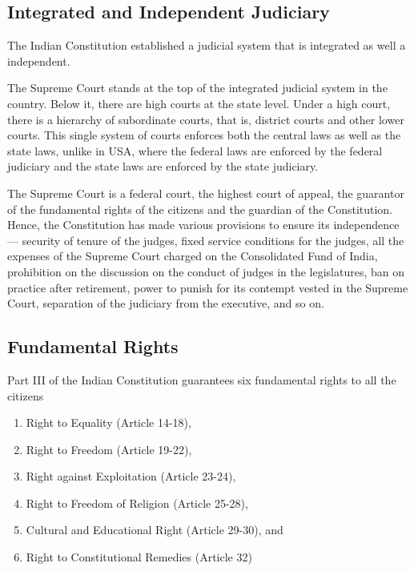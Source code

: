 \subsection{Integrated and Independent Judiciary}

The Indian Constitution established a judicial system that is integrated as well a independent.

The Supreme Court stands at the top of the integrated judicial system in the country. Below it, there are high courts at the state level. Under a high court, there is a hierarchy of subordinate courts, that is, district courts and other lower courts. This single system of courts enforces both the central laws as well as the state laws, unlike in USA, where the federal laws are enforced by the federal judiciary and the state laws are enforced by the state judiciary.

The Supreme Court is a federal court, the highest court of appeal, the guarantor of the fundamental rights of the citizens and the guardian of the Constitution. Hence, the Constitution has made various provisions to ensure its independence — security of tenure of the judges, fixed service conditions for the judges, all the expenses of the Supreme Court charged on the Consolidated Fund of India, prohibition on the discussion on the conduct of judges in the legislatures, ban on practice after retirement, power to punish for its contempt vested in the Supreme Court, separation of the judiciary from the executive, and so on.

\subsection{Fundamental Rights}

Part III of the Indian Constitution guarantees six fundamental rights to all the citizens

\renewcommand{\labelenumi}{\textbf{(\alph{enumi})}}
\begin{enumerate}
  \item Right to Equality (Article 14-18),
  \item Right to Freedom (Article 19-22),
  \item Right against Exploitation (Article 23-24),
  \item Right to Freedom of Religion (Article 25-28),
  \item Cultural and Educational Right (Article 29-30), and
  \item Right to Constitutional Remedies (Article 32)
\end{enumerate}

